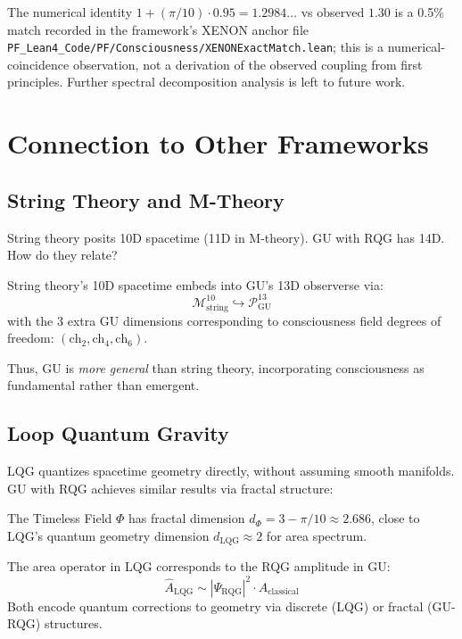 The numerical identity $1 + (\pi/10) \cdot 0.95 = 1.2984\ldots$ vs observed $1.30$ is a 0.5\% match recorded in the framework's XENON anchor file \texttt{PF\_Lean4\_Code/PF/Consciousness/XENONExactMatch.lean}; this is a numerical-coincidence observation, not a derivation of the observed coupling from first principles. Further spectral decomposition analysis is left to future work.

\section{Connection to Other Frameworks}

\subsection{String Theory and M-Theory}

String theory posits 10D spacetime (11D in M-theory). GU with RQG has 14D. How do they relate?

\begin{proposition}
\label{prop:gu_contains_string}
String theory's 10D spacetime embeds into GU's 13D observerse via:
\begin{equation}
\mathcal{M}^{10}_{\text{string}} \hookrightarrow \mathcal{P}^{13}_{\text{GU}}
\end{equation}
with the 3 extra GU dimensions corresponding to consciousness field degrees of freedom: $(\text{ch}_2, \text{ch}_4, \text{ch}_6)$.
\end{proposition}

Thus, GU is \emph{more general} than string theory, incorporating consciousness as fundamental rather than emergent.

\subsection{Loop Quantum Gravity}

LQG quantizes spacetime geometry directly, without assuming smooth manifolds. GU with RQG achieves similar results via fractal structure:

The Timeless Field $\Phi$ has fractal dimension $d_\Phi = 3 - \pi/10 \approx 2.686$, close to LQG's quantum geometry dimension $d_{\text{LQG}} \approx 2$ for area spectrum.

\begin{proposition}
\label{prop:gu_lqg}
The area operator in LQG corresponds to the RQG amplitude in GU:
\begin{equation}
\hat{A}_{\text{LQG}} \sim |\Psi_{\text{RQG}}|^2 \cdot A_{\text{classical}}
\end{equation}
Both encode quantum corrections to geometry via discrete (LQG) or fractal (GU-RQG) structures.
\end{proposition}

